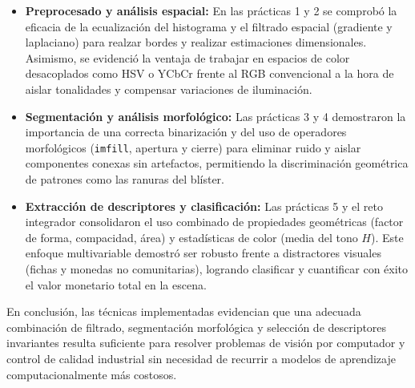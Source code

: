 \documentclass[12pt,a4paper]{article}
\begin{document}
	\begin{itemize}[leftmargin=1.5em]
		\item \textbf{Preprocesado y análisis espacial:} En las prácticas 1 y 2 se comprobó la eficacia de la ecualización del histograma y el filtrado espacial (gradiente y laplaciano) para realzar bordes y realizar estimaciones dimensionales. Asimismo, se evidenció la ventaja de trabajar en espacios de color desacoplados como HSV o YCbCr frente al RGB convencional a la hora de aislar tonalidades y compensar variaciones de iluminación.
		\item \textbf{Segmentación y análisis morfológico:} Las prácticas 3 y 4 demostraron la importancia de una correcta binarización y del uso de operadores morfológicos (\texttt{imfill}, apertura y cierre) para eliminar ruido y aislar componentes conexas sin artefactos, permitiendo la discriminación geométrica de patrones como las ranuras del blíster.
		\item \textbf{Extracción de descriptores y clasificación:} Las prácticas 5 y el reto integrador consolidaron el uso combinado de propiedades geométricas (factor de forma, compacidad, área) y estadísticas de color (media del tono $H$). Este enfoque multivariable demostró ser robusto frente a distractores visuales (fichas y monedas no comunitarias), logrando clasificar y cuantificar con éxito el valor monetario total en la escena.
	\end{itemize}
	
	En conclusión, las técnicas implementadas evidencian que una adecuada combinación de filtrado, segmentación morfológica y selección de descriptores invariantes resulta suficiente para resolver problemas de visión por computador y control de calidad industrial sin necesidad de recurrir a modelos de aprendizaje computacionalmente más costosos.
	
\end{document}
